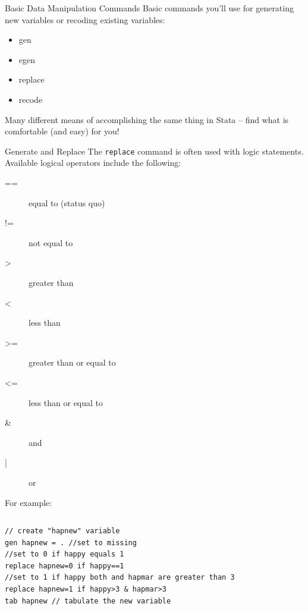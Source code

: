 \documentclass[table,smaller]{beamer}
\begin{document}
\begin{frame}[label=sec-2-1]{Basic Data Manipulation Commands}
Basic commands you'll use for generating new variables or recoding existing variables:
\begin{itemize}
\item gen
\item egen
\item replace
\item recode
\end{itemize}
Many different means of accomplishing the same thing in Stata -- find what is comfortable (and easy) for you!
\end{frame}
\begin{frame}[fragile,label=sec-2-2]{Generate and Replace}
 The \verb~replace~ command is often used with logic statements. Available logical operators include the following:
\begin{description}
\item[{==}] equal to (status quo)
\item[{!=}] not equal to
\item[{>}] greater than
\item[{<}] less than
\item[{>=}] greater than or equal to
\item[{<=}] less than or equal to
\item[{\&}] and
\item[{|}] or
\end{description}

For example:

\vspace{-.5em} \begin{columns}  \begin{block}{}
\begin{verbatim}
// create "hapnew" variable
gen hapnew = . //set to missing
//set to 0 if happy equals 1
replace hapnew=0 if happy==1 
//set to 1 if happy both and hapmar are greater than 3
replace hapnew=1 if happy>3 & hapmar>3
tab hapnew // tabulate the new variable
\end{verbatim}
\end{block} \end{columns}
\end{frame}
\end{document}
